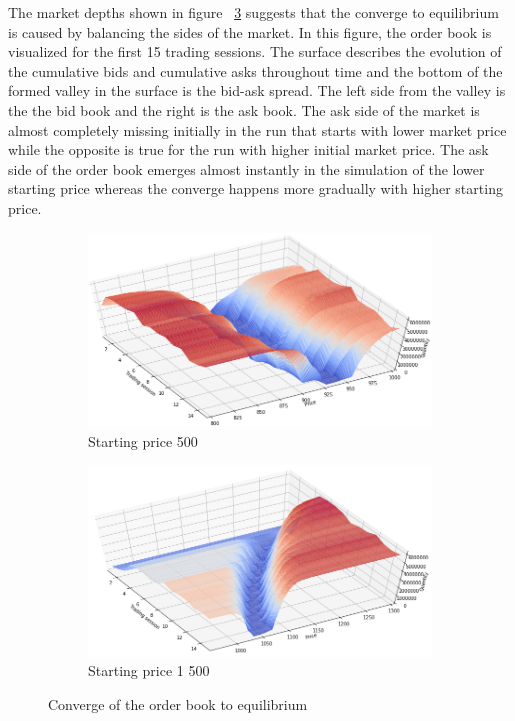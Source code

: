 The market depths shown in figure ~\ref{fig:market_depths} suggests that the
converge to equilibrium is caused by balancing the sides of the market. 
In this figure, the order book is visualized for the first 15 trading sessions. 
The surface describes the evolution of the cumulative bids and cumulative asks 
throughout time and the bottom of the formed valley in the surface is the bid-ask spread. 
The left side from the valley is the the bid book and the right is the ask book. The 
ask side of the market is almost completely missing initially in the run that
starts with lower market price while the opposite is true for the run with higher
initial market price. The ask side of the order book emerges almost instantly 
in the simulation of the lower starting price whereas the converge happens more 
gradually with higher starting price.


\begin{figure}
    \centering
    \begin{subfigure}{.5\textwidth}
      \centering
      \includegraphics[width=\linewidth]{plots/basic_market_depth_converge_lower.png}
      \caption{Starting price 500}
      \label{fig:market_depth_lower}
    \end{subfigure}%
    \begin{subfigure}{.5\textwidth}
      \centering
      \includegraphics[width=\linewidth]{plots/basic_market_depth_converge_higher.png}
      \caption{Starting price 1 500}
      \label{fig:market_depth_higher}
    \end{subfigure}
    \caption{Converge of the order book to equilibrium}
    \label{fig:market_depths}
\end{figure}

